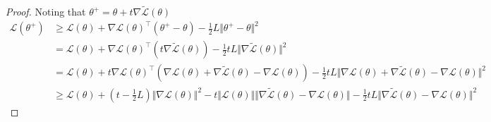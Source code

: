 \begin{theorem}
    
\end{theorem}
\begin{proof}

Noting that $\theta^+=\theta+t\nabla \tilde{\mathcal{L}}(\theta)$
    \begin{align*}
        \mathcal{L}(\theta^+)&\geq  \mathcal{L}(\theta)+\nabla \mathcal{L}(\theta)^\top(\theta^+-\theta)-\frac{1}{2}L\Vert \theta^+-\theta\Vert^2\\
        &= \mathcal{L}(\theta)+\nabla \mathcal{L}(\theta)^\top(t\nabla \tilde{\mathcal{L}}(\theta))-\frac{1}{2}tL\Vert\nabla \tilde{\mathcal{L}}(\theta)\Vert^2\\
        &= \mathcal{L}(\theta)+t\nabla \mathcal{L}(\theta)^\top(\nabla\mathcal{L}(\theta)+\nabla \tilde{\mathcal{L}}(\theta)-\nabla\mathcal{L}(\theta))-\frac{1}{2}tL\Vert\nabla \mathcal{L}(\theta)+\nabla \tilde{\mathcal{L}}(\theta)-\nabla\mathcal{L}(\theta)\Vert^2\\
        &\geq \mathcal{L}(\theta)+\left(t-\frac{1}{2}L\right)\Vert \nabla \mathcal{L}(\theta)\Vert^2-t\Vert\mathcal{L}(\theta)\Vert\Vert \nabla\tilde{\mathcal{L}}(\theta)-\nabla\mathcal{L}(\theta)\Vert-\frac{1}{2}tL\Vert \nabla\tilde{\mathcal{L}}(\theta)-\nabla\mathcal{L}(\theta)\Vert^2
    \end{align*}
\end{proof}





